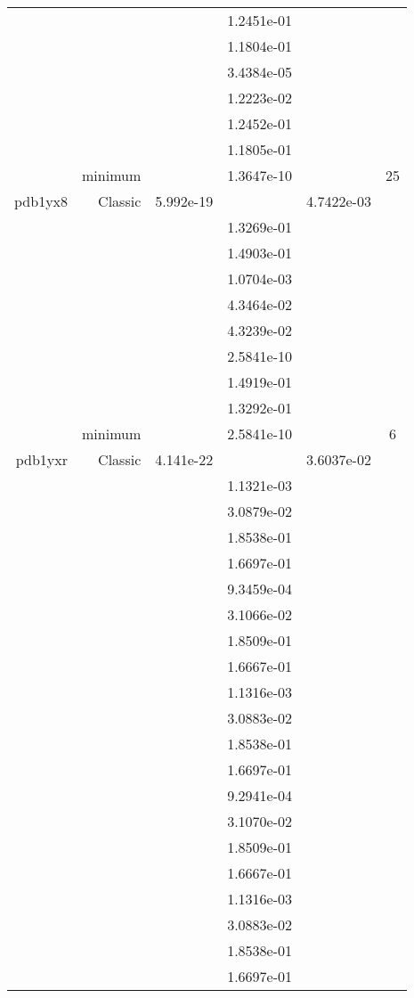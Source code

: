 \begin{xltabular}{\textwidth}{r|rS[table-format=1.3e+2]S[table-format=1.4e+2]S[table-format=1.4e+2]S[table-format=-1.5]}
&  &  & 1.2451e-01 & & \\
&  &  & 1.1804e-01 & & \\
&  &  & 3.4384e-05 & & \\
&  &  & 1.2223e-02 & & \\
&  &  & 1.2452e-01 & & \\
&  &  & 1.1805e-01 & & \\
& minimum &  & 1.3647e-10 & & 25 \\  \addlinespace
pdb1yx8 & Classic & 5.992e-19 &  & 4.7422e-03 & \\
&  &  & 1.3269e-01 & & \\
&  &  & 1.4903e-01 & & \\
&  &  & 1.0704e-03 & & \\
&  &  & 4.3464e-02 & & \\
&  &  & 4.3239e-02 & & \\
&  &  & 2.5841e-10 & & \\
&  &  & 1.4919e-01 & & \\
&  &  & 1.3292e-01 & & \\
& minimum &  & 2.5841e-10 & & 6 \\  \addlinespace
pdb1yxr & Classic & 4.141e-22 &  & 3.6037e-02 & \\
&  &  & 1.1321e-03 & & \\
&  &  & 3.0879e-02 & & \\
&  &  & 1.8538e-01 & & \\
&  &  & 1.6697e-01 & & \\
&  &  & 9.3459e-04 & & \\
&  &  & 3.1066e-02 & & \\
&  &  & 1.8509e-01 & & \\
&  &  & 1.6667e-01 & & \\
&  &  & 1.1316e-03 & & \\
&  &  & 3.0883e-02 & & \\
&  &  & 1.8538e-01 & & \\
&  &  & 1.6697e-01 & & \\
&  &  & 9.2941e-04 & & \\
&  &  & 3.1070e-02 & & \\
&  &  & 1.8509e-01 & & \\
&  &  & 1.6667e-01 & & \\
&  &  & 1.1316e-03 & & \\
&  &  & 3.0883e-02 & & \\
&  &  & 1.8538e-01 & & \\
&  &  & 1.6697e-01 & & \\

\end{xltabular}
